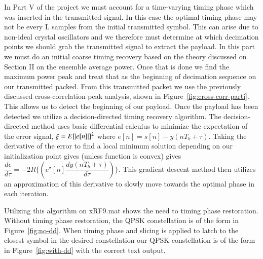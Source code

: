 In Part V of the project we must account for a time-varying timing phase which was inserted in the transmitted signal. In this case the optimal timing phase may not be every L samples from the initial transmitted symbol. This can arise due to non-ideal crystal oscillators and we therefore must determine at which decimation points we should grab the transmitted signal to extract the payload. In this part we must do an initial coarse timing recovery based on the theory discussed on Section II on the ensemble average power. Once that is done we find the maximum power peak and treat that as the beginning of decimation sequence on our transmitted packed. From this transmitted packet we use the previously discussed cross-correlation peak analysis, shown in Figure~\ref{fig:cross-corr-parti}. This allows us to detect the beginning of our payload. Once the payload has been detected we utilize a decision-directed timing recovery algorithm. The decision-directed method uses basic differential calculus to minimize the expectation of the error signal, $\xi = E[\lvert{e[n]}\rvert]^2$ where $e[n] = s[n] - y(nT_b + \tau)$. Taking the derivative of the error to find a local minimum solution depending on our initialization point gives (unless function is convex) gives $\dfrac{d\epsilon}{d\tau} =  -2R\{(e^{\star}[n]\dfrac{dy(nT_b + \tau)}{d\tau})\}$. This gradient descent method then utilizes an approximation of this derivative to slowly move towards the optimal phase in each iteration.

Utilizing this algorithm on xRF9.mat shows the need to timing phase restoration. Without timing phase restoration, the QPSK constellation is of the form in Figure~\ref{fig:no-dd}. When timing phase and slicing is applied to latch to the closest symbol in the desired constellation our QPSK constellation is of the form in Figure~\ref{fig:with-dd} with the correct text output.